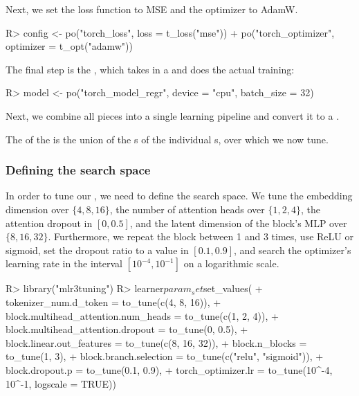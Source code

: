 \documentclass[article,shortnames]{jss}
\theoremstyle{definition}
\renewenvironment{CodeChunk}{\par\addvspace{0.6\baselineskip}\noindent\begin{minipage}{\linewidth}}{\end{minipage}\par\vspace{0.6\baselineskip}}
\begin{document}
Next, we set the loss function to MSE and the optimizer to AdamW.

\begin{CodeChunk}
\begin{CodeInput}
R> config <- po("torch_loss", loss = t_loss("mse")) %
+    po("torch_optimizer", optimizer = t_opt("adamw"))
\end{CodeInput}
\end{CodeChunk}

The final step is the , which takes in a  and does the actual training:

\begin{CodeChunk}
\begin{CodeInput}
R> model <- po("torch_model_regr", device = "cpu", batch_size = 32)
\end{CodeInput}
\end{CodeChunk}

Next, we combine all pieces into a single learning pipeline and convert it to a .

\begin{CodeChunk}
\end{CodeChunk}

The  of the  is the union of the s of the individual s, over which we now tune.

\subsubsection{Defining the search space}
In order to tune our , we need to define the search space.
We tune the embedding dimension over $\{4, 8, 16\}$, the number of attention heads over $\{1, 2, 4\}$, the attention dropout in $[0, 0.5]$, and the latent dimension of the block's MLP over $\{8, 16, 32\}$.
Furthermore, we repeat the block between 1 and 3 times, use ReLU or sigmoid, set the dropout ratio to a value in $[0.1, 0.9]$, and search the optimizer's learning rate in the interval $[10^{-4}, 10^{-1}]$ on a logarithmic scale.

\begin{CodeChunk}
\begin{CodeInput}
R> library("mlr3tuning")
R> learner$param_set$set_values(
+    tokenizer_num.d_token = to_tune(c(4, 8, 16)),
+    block.multihead_attention.num_heads = to_tune(c(1, 2, 4)),
+    block.multihead_attention.dropout = to_tune(0, 0.5),
+    block.linear.out_features = to_tune(c(8, 16, 32)),
+    block.n_blocks = to_tune(1, 3),
+    block.branch.selection = to_tune(c("relu", "sigmoid")),
+    block.dropout.p = to_tune(0.1, 0.9),
+    torch_optimizer.lr = to_tune(10^-4, 10^-1, logscale = TRUE))
\end{CodeInput}
\end{CodeChunk}
\end{document}

